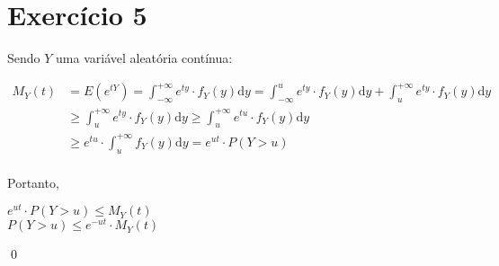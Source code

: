 \documentclass[12pt,letterpaper]{article}
\begin{document}
	\section*{Exercício 5}
	
	Sendo $Y$ uma variável aleatória contínua:
	
	\begin{equation*}
		\begin{split}
			M_Y(t) & = E(e^{tY}) = \int_{-\infty}^{+\infty} e^{ty} \cdot f_Y(y)\text{d}y = \int_{-\infty}^{u} e^{ty} \cdot f_Y(y)\text{d}y + \int_{u}^{+\infty} e^{ty} \cdot f_Y(y)\text{d}y \\
			& \geq \int_{u}^{+\infty} e^{ty} \cdot f_Y(y)\text{d}y \geq \int_{u}^{+\infty} e^{tu} \cdot f_Y(y)\text{d}y \\
			& \geq e^{tu} \cdot \int_{u}^{+\infty} f_Y(y)\text{d}y = e^{ut} \cdot P(Y > u)\\
		\end{split}
	\end{equation*}
	
	Portanto,
	
	\begin{center}
		$e^{ut} \cdot P(Y > u) \leq M_Y(t)$ \\
		$P(Y > u) \leq e^{-ut} \cdot M_Y(t)$ \\
	\end{center}
	 
	\qed 
	 
\end{document}
